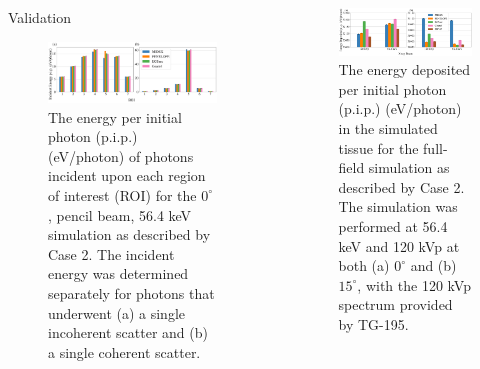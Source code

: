 \documentclass[final]{beamer}
\newlength{\sepwidth}
\newlength{\colwidth}
\newcommand{\separatorcolumn}{\begin{column}{\sepwidth}\end{column}}
\begin{document}
\begin{frame}[t]
\begin{columns}[t]
\begin{column}{\colwidth}
\begin{block}{Validation}
    \begin{figure}
      \centering
      \includegraphics[width = \colwidth]{ROI_0_deg__pencil_paper_ready_wo_mutiple.pdf}
      \caption{The energy per initial photon (p.i.p.) (eV/photon) of photons incident upon each region of interest (ROI) for the $0^\circ$, pencil beam, 56.4 keV simulation as described by Case 2. The incident energy was determined separately for photons that underwent (a) a single incoherent scatter and (b) a single coherent scatter.}
      \label{fig:ROIPGraph}
    \end{figure}
  \end{block}

\end{column}

\separatorcolumn

\begin{column}{\colwidth}

    \begin{figure}
      \centering
    \includegraphics[width= \colwidth]{radiography_body_dep_paper_ready.pdf}
    \caption{The energy deposited per initial photon (p.i.p.) (eV/photon) in the simulated tissue for the full-field simulation as described by Case 2. The simulation was performed at 56.4 keV and 120 kVp at both (a) $0^\circ$ and (b) $15^\circ$, with the 120 kVp spectrum provided by TG-195.}
     \label{fig:BDGraph}
    \end{figure}


\end{column}
\end{columns}
\end{frame}
\end{document}
